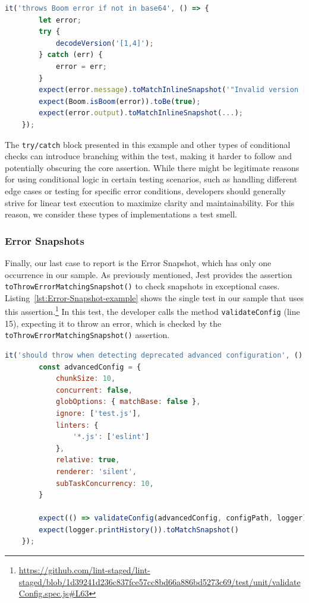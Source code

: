\documentclass[
	msc, %
	english %
]{../ppgccufmg}
\begin{document}
            \begin{lstlisting}[language=javascript, caption= Non-linear test in \texttt{elastic/kibana}, label=lst:Non-Linear-Logic-example]
    it('throws Boom error if not in base64', () => {
        let error;
        try {
            decodeVersion('[1,4]');
        } catch (err) {
            error = err;
        }
        expect(error.message).toMatchInlineSnapshot('"Invalid version [[1,4]]"');
        expect(Boom.isBoom(error)).toBe(true);
        expect(error.output).toMatchInlineSnapshot(...);
    });
            \end{lstlisting}
            
            The \texttt{try/catch} block presented in this example and other types of conditional checks can introduce branching within the test, making it harder to follow and potentially obscuring the core assertion. While there might be legitimate reasons for using conditional logic in certain testing scenarios, such as handling different edge cases or testing for specific error conditions, developers should generally strive for linear test execution to maximize clarity and maintainability. For this reason, we consider these types of implementations a test smell.

        \subsubsection{Error Snapshots}
        
        Finally, our last case to report is the Error Snapshot, which has only one occurrence in our sample. As previously mentioned, Jest provides the assertion \texttt{toThrow\-ErrorMatchingSnapshot()} to check snapshots in exceptional cases. Listing~\ref{lst:Error-Snapshot-example} shows the single test in our sample that uses this assertion.\footnote{\url{https://github.com/lint-staged/lint-staged/blob/1d39241d236c837fce57cc8bd66a886bd5273c69/test/unit/validateConfig.spec.js\#L63}} In this test, the developer calls the method \texttt{validateConfig} (line 15), expecting it to throw an error, which is checked by the \texttt{toThrowErrorMatchingSnapshot()} assertion.\\
           
        \begin{lstlisting}[language=javascript, caption=  Error snapshot snippet from \texttt{okonet/lint-staged}, label=lst:Error-Snapshot-example]
    it('should throw when detecting deprecated advanced configuration', () => {
        const advancedConfig = {
            chunkSize: 10,
            concurrent: false,
            globOptions: { matchBase: false },
            ignore: ['test.js'],
            linters: { 
                '*.js': ['eslint'] 
            },
            relative: true,
            renderer: 'silent',
            subTaskConcurrency: 10,
        }
        
        expect(() => validateConfig(advancedConfig, configPath, logger)). toThrowErrorMatchingSnapshot()
        expect(logger.printHistory()).toMatchSnapshot()
    });
        \end{lstlisting}
           
\end{document}
